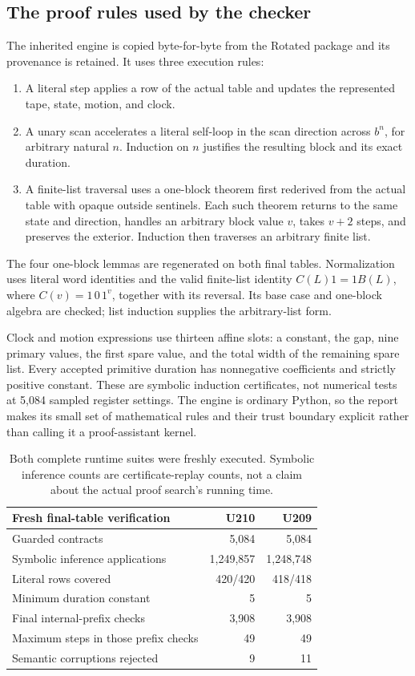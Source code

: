 \subsection{The proof rules used by the checker}
The inherited engine is copied byte-for-byte from the Rotated package and
its provenance is retained. It uses three execution rules:
\begin{enumerate}
\item A literal step applies a row of the actual table and updates the
represented tape, state, motion, and clock.
\item A unary scan accelerates a literal self-loop in the scan direction
across \(b^n\), for arbitrary natural \(n\). Induction on \(n\) justifies
the resulting block and its exact duration.
\item A finite-list traversal uses a one-block theorem first rederived from
the actual table with opaque outside sentinels. Each such theorem returns
to the same state and direction, handles an arbitrary block value \(v\),
takes \(v+2\) steps, and preserves the exterior. Induction then traverses an
arbitrary finite list.
\end{enumerate}
The four one-block lemmas are regenerated on both final tables.
Normalization uses literal word identities and the valid finite-list identity
\(C(L)1=1B(L)\), where \(C(v)=1\,0\,1^v\), together with its reversal.
Its base case and one-block algebra are checked; list induction supplies
the arbitrary-list form.

Clock and motion expressions use thirteen affine slots: a constant, the gap,
nine primary values, the first spare value, and the total width of the
remaining spare list. Every accepted primitive duration has nonnegative
coefficients and strictly positive constant. These are symbolic induction
certificates, not numerical tests at 5,084 sampled register settings.
The engine is ordinary Python, so the report makes its small set of
mathematical rules and their trust boundary explicit rather than calling it
a proof-assistant kernel.

\begin{table}[ht]
\centering
\begin{tabular}{lrr}
\toprule
Fresh final-table verification & U210 & U209\\
\midrule
Guarded contracts & 5,084 & 5,084\\
Symbolic inference applications & 1,249,857 & 1,248,748\\
Literal rows covered & 420/420 & 418/418\\
Minimum duration constant & 5 & 5\\
Final internal-prefix checks & 3,908 & 3,908\\
Maximum steps in those prefix checks & 49 & 49\\
Semantic corruptions rejected & 9 & 11\\
\bottomrule
\end{tabular}
\caption{Both complete runtime suites were freshly executed.
Symbolic inference counts are certificate-replay counts, not a claim about
the actual proof search's running time.}
\end{table}

